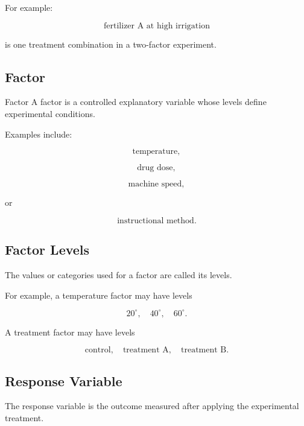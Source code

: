 For example:

\[
\boxed{
\text{fertilizer A at high irrigation}
}
\]

is one treatment combination in a two-factor experiment.

\subsection{Factor}
\label{subsec:factor-design}

\begin{definitionbox}{Factor}
A factor is a controlled explanatory variable whose levels define
experimental conditions.
\end{definitionbox}

Examples include:

\[
\boxed{
\text{temperature},
}
\]

\[
\boxed{
\text{drug dose},
}
\]

\[
\boxed{
\text{machine speed},
}
\]

or

\[
\boxed{
\text{instructional method}.
}
\]

\subsection{Factor Levels}
\label{subsec:factor-levels-design}

The values or categories used for a factor are called its levels.

For example, a temperature factor may have levels

\[
\boxed{
20^\circ,
\quad
40^\circ,
\quad
60^\circ.
}
\]

A treatment factor may have levels

\[
\boxed{
\text{control},
\quad
\text{treatment A},
\quad
\text{treatment B}.
}
\]

\subsection{Response Variable}
\label{subsec:response-variable-design}

The response variable is the outcome measured after applying the
experimental treatment.

